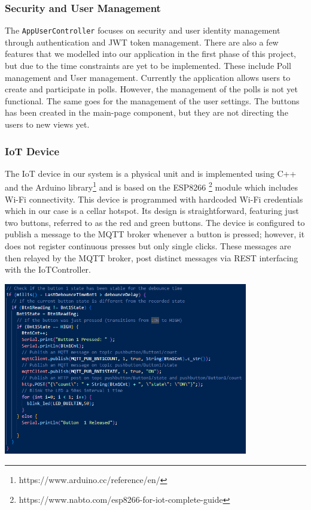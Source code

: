 \subsubsection{Security and User Management}
The \texttt{AppUserController} focuses on security and user identity management through authentication and JWT token management.  There are also a few features that we modelled into our application in the first phase of this project,
but due to the time constraints are yet to be implemented. These include Poll management and User
management. Currently the application allows users to create and participate in polls. However, the
management of the polls is not yet functional. The same goes for the management of the user
settings. The buttons has been created in the main-page component, but they are not directing the
users to new views yet.

\subsubsection{IoT Device}
The IoT device in our system is a physical unit and is implemented using C++ and the Arduino library\footnote{https://www.arduino.cc/reference/en/} and is based on the ESP8266 \footnote{https://www.nabto.com/esp8266-for-iot-complete-guide} module which includes Wi-Fi connectivity. This device is programmed with hardcoded Wi-Fi credentials which in our case is a cellar hotspot. Its design is straightforward, featuring just two buttons, referred to as the red and green buttons. The device is configured to publish a message to the MQTT broker whenever a button is pressed; however, it does not register continuous presses but only single clicks. These messages are then relayed by the MQTT broker, post distinct messages via REST interfacing with the IoTController.

  \begin{center}
  \includegraphics[width=0.80\textwidth]{figs/button1_pressed.png}
  \end{center}

